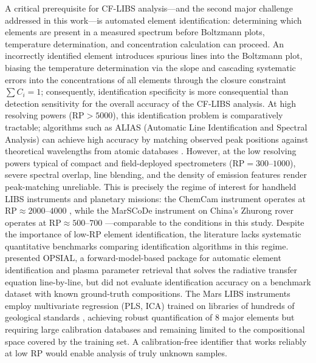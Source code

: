 A critical prerequisite for CF-LIBS analysis---and the second major challenge addressed in this work---is automated element identification: determining which elements are present in a measured spectrum before Boltzmann plots, temperature determination, and concentration calculation can proceed.
An incorrectly identified element introduces spurious lines into the Boltzmann plot, biasing the temperature determination via the slope and cascading systematic errors into the concentrations of all elements through the closure constraint $\sum C_i = 1$; consequently, identification specificity is more consequential than detection sensitivity for the overall accuracy of the CF-LIBS analysis.
At high resolving powers ($\mathrm{RP} > 5000$), this identification problem is comparatively tractable; algorithms such as ALIAS (Automatic Line Identification and Spectral Analysis) can achieve high accuracy by matching observed peak positions against theoretical wavelengths from atomic databases \citep{Labutin2013}.
However, at the low resolving powers typical of compact and field-deployed spectrometers ($\mathrm{RP} = 300$--$1000$), severe spectral overlap, line blending, and the density of emission features render peak-matching unreliable.
This is precisely the regime of interest for handheld LIBS instruments and planetary missions: the ChemCam instrument operates at $\mathrm{RP} \approx 2000$--$4000$ \citep{Wiens2013,Clegg2017}, while the MarSCoDe instrument on China's Zhurong rover operates at $\mathrm{RP} \approx 500$--$700$ \citep{Wiens2025}---comparable to the conditions in this study.
Despite the importance of low-RP element identification, the literature lacks systematic quantitative benchmarks comparing identification algorithms in this regime.
\citet{Tan2019} presented OPSIAL, a forward-model-based package for automatic element identification and plasma parameter retrieval that solves the radiative transfer equation line-by-line, but did not evaluate identification accuracy on a benchmark dataset with known ground-truth compositions.
The Mars LIBS instruments employ multivariate regression (PLS, ICA) trained on libraries of hundreds of geological standards \citep{Clegg2017}, achieving robust quantification of 8 major elements but requiring large calibration databases and remaining limited to the compositional space covered by the training set.
A calibration-free identifier that works reliably at low RP would enable analysis of truly unknown samples.

